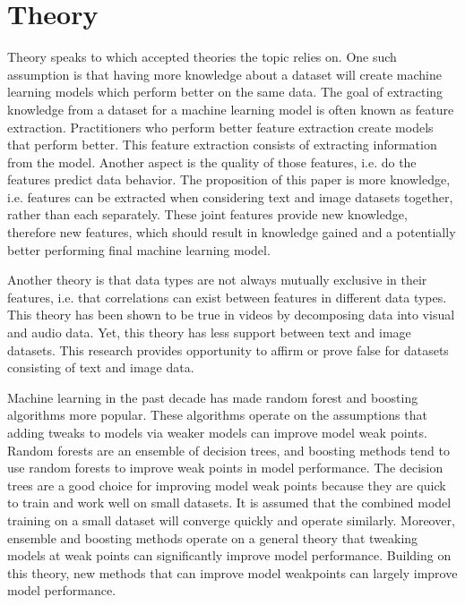 \chapter{Theory} %

Theory speaks to which accepted theories the topic relies on.  One such assumption is that having more knowledge about a dataset will create machine learning models which perform better on the same data.  The goal of extracting knowledge from a dataset for a machine learning model is often known as feature extraction.  Practitioners who perform better feature extraction create models that perform better.  This feature extraction consists of extracting information from the model.  Another aspect is the quality of those features, i.e. do the features predict data behavior.  The proposition of this paper is more knowledge, i.e. features can be extracted when considering text and image datasets together, rather than each separately.  These joint features provide new knowledge, therefore new features, which should result in knowledge gained and a potentially better performing final machine learning model.  

Another theory is that data types are not always mutually exclusive in their features, i.e. that correlations can exist between features in different data types.  This theory has been shown to be true in videos by decomposing data into visual and audio data.  Yet, this theory has less support between text and image datasets.  This research provides opportunity to affirm or prove false for datasets consisting of text and image data.  

Machine learning in the past decade has made random forest and boosting algorithms more popular.  These algorithms operate on the assumptions that adding tweaks to models via weaker models can improve model weak points.  Random forests are an ensemble of decision trees, and boosting methods tend to use random forests to improve weak points in model performance.  The decision trees are a good choice for improving model weak points because they are quick to train and work well on small datasets.  It is assumed that the combined model training on a small dataset will converge quickly and operate similarly.  Moreover, ensemble and boosting methods operate on a general theory that tweaking models at weak points can significantly improve model performance.  Building on this theory, new methods that can improve model weakpoints can largely improve model performance.  


